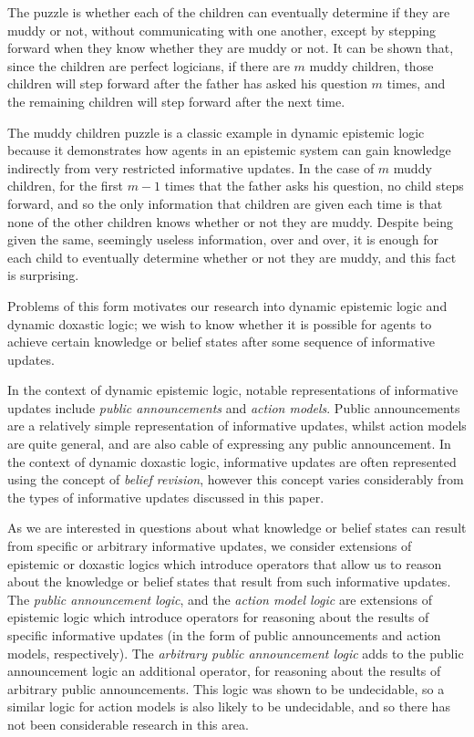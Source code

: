 The puzzle is whether each of the children can eventually determine if they are
muddy or not, without communicating with one another, except by stepping forward
when they know whether they are muddy or not. It can be shown that, since the
children are perfect logicians, if there are $m$ muddy children, those children
will step forward after the father has asked his question $m$ times, and the
remaining children will step forward after the next time.

The muddy children puzzle is a classic example in dynamic epistemic logic
because it demonstrates how agents in an epistemic system can gain knowledge
indirectly from very restricted informative updates. In the case of $m$ muddy
children, for the first $m - 1$ times that the father asks his question, no
child steps forward, and so the only information that children are given each
time is that none of the other children knows whether or not they are muddy.
Despite being given the same, seemingly useless information, over and over, it
is enough for each child to eventually determine whether or not they are muddy,
and this fact is surprising.

Problems of this form motivates our research into dynamic epistemic logic and
dynamic doxastic logic; we wish to know whether it is possible for agents to
achieve certain knowledge or belief states after some sequence of informative
updates. %


In the context of dynamic epistemic logic, notable representations of
informative updates include {\em public announcements} and {\em action models}.
Public announcements are a relatively simple representation of informative
updates, whilst action models are quite general, and are also cable of
expressing any public announcement. In the context of dynamic doxastic logic,
informative updates are often represented using the concept of {\em belief
revision}, however this concept varies considerably from the types of
informative updates discussed in this paper.

As we are interested in questions about what knowledge or belief states can
result from specific or arbitrary informative updates, we consider extensions of
epistemic or doxastic logics which introduce operators that allow us to reason
about the knowledge or belief states that result from such informative updates.
The {\em public announcement logic}, and the {\em action model logic} are
extensions of epistemic logic which introduce operators for reasoning about the
results of specific informative updates (in the form of public announcements and
action models, respectively). The {\em arbitrary public announcement logic} adds
to the public announcement logic an additional operator, for reasoning about the
results of arbitrary public announcements. This logic was shown to be
undecidable, so a similar logic for action models is also likely to be
undecidable, and so there has not been considerable research in this area.

